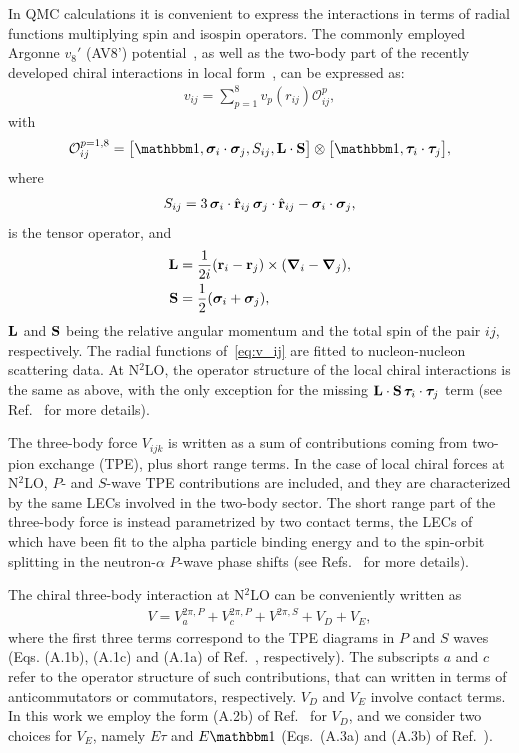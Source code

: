 \documentclass[aps,prc,twocolumn,superscriptaddress,showpacs,floatfix,nofootinbib]{revtex4-1}
\begin{document}
In QMC calculations it is convenient to express the interactions
in terms of radial functions multiplying spin and isospin operators. The commonly 
employed Argonne $v_8'$ (AV8') potential~\cite{Wiringa:2002}, as well as the two-body
part of the recently developed chiral interactions in local form~\cite{Gezerlis:2013}, 
can be expressed as:
\begin{align}
	v_{ij} = \sum_{p=1}^8 v_p(r_{ij}) \mathcal O_{ij}^{p},
	\label{eq:v_ij}
\end{align}
with
\begin{align}
	\mathcal O_{ij}^{p=1,8} = \big[\mathbbm 1,\bm\sigma_i\cdot\bm\sigma_j,S_{ij},\vb{L}\cdot\vb{S}\big]
	\otimes\big[\mathbbm 1,\bm\tau_i\cdot\bm\tau_j\big],
\end{align}
where
\begin{align}
	S_{ij}=3\,\bm\sigma_i\cdot\hat{\vb{r}}_{ij}\,\bm\sigma_j\cdot\hat{\vb{r}}_{ij}-\bm\sigma_i\cdot\bm\sigma_j,
\end{align}
is the tensor operator, and
\begin{align}
	\vb{L}&=\frac{1}{2i}(\vb{r}_i-\vb{r}_j)\times(\bm\nabla_i-\bm\nabla_j), \label{eq:L} \\
	\vb{S}&=\frac{1}{2}(\bm\sigma_i+\bm\sigma_j), \label{eq:S}
\end{align}
$\vb{L}$ and $\vb{S}$ being the relative angular momentum and the total spin of the pair $ij$, respectively.
The radial functions of~\cref{eq:v_ij} are fitted to nucleon-nucleon scattering data.
At N$^2$LO, the operator structure of the local chiral interactions is the same as 
above, with the only exception for the missing $\vb{L}\cdot\vb{S}\,\bm\tau_i\cdot\bm\tau_j$ term
(see Ref.~\cite{Gezerlis:2014} for more details).

The three-body force $V_{ijk}$ is written as a sum of contributions coming from two-pion
exchange (TPE), plus short range terms. In the case of local chiral forces at N$^2$LO, $P$- and $S$-wave
TPE contributions are included, and they are characterized by the same LECs involved in the two-body sector. 
The short range part of the three-body force is instead parametrized by two contact terms, 
the LECs of which have been fit to the alpha particle binding energy and to the spin-orbit splitting in 
the neutron-$\alpha$ $P$-wave phase shifts (see Refs.~\cite{Lynn:2016,Lynn:2017} for more details).

The chiral three-body interaction at N$^2$LO can be conveniently written as
\begin{align}
V=V_a^{2\pi,P}+V_c^{2\pi,P}+V^{2\pi,S}+V_D+V_E,
\label{eq:v_ijk}
\end{align}
where the first three terms correspond to the TPE diagrams in $P$ and $S$ waves (Eqs. (A.1b),
(A.1c) and (A.1a) of Ref.~\cite{Lynn:2017}, respectively). The subscripts $a$ and $c$ refer 
to the operator structure of such contributions, that can written in terms of anticommutators 
or commutators, respectively. $V_D$ and $V_E$ involve contact terms. In this work we employ
the form (A.2b) of Ref.~\cite{Lynn:2017} for $V_D$, and we consider two choices for $V_E$, 
namely $E\tau$ and $E\mathbbm1$ (Eqs.~(A.3a) and (A.3b) of Ref.~\cite{Lynn:2017}).
\end{document}
